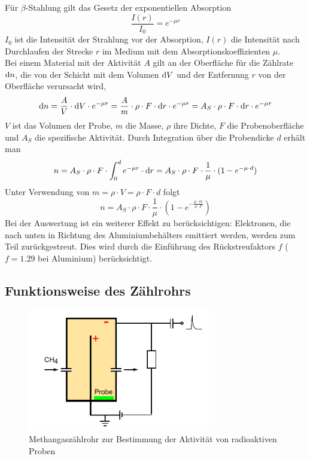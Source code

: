 Für $\beta$-Stahlung gilt das Gesetz der exponentiellen Absorption
\begin{equation}
  \frac{I(r)}{I_0} =e^{-\mu r}
\end{equation}
$I_0$ ist die Intensität der Strahlung vor der Absorption, $I(r)$ die Intensität nach
Durchlaufen der Strecke $r$ im Medium mit dem Absorptionskoeffizienten $\mu$.\\
Bei einem Material mit der Aktivität $A$ gilt an der Oberfläche für die Zählrate $\mathrm{d} n$,
die von der Schicht mit dem Volumen $\mathrm{d} V$ und
der Entfernung $r$ von der Oberfläche verursacht wird,
\begin{equation}
  \mathrm{d} n= \frac{A}{V} \cdot \mathrm{d} V \cdot e^{-\mu r}=
  \frac{A}{m} \cdot \rho \cdot F \cdot \mathrm{d} r \cdot e^{-\mu r}=
  A_S \cdot \rho \cdot F \cdot \mathrm{d} r \cdot e^{-\mu r}
\end{equation}
$V$ ist das Volumen der Probe, $m$ die Masse, $\rho$ ihre Dichte, $F$ die Probenoberfläche und $A_S$
die spezifische Aktivität. Durch Integration über die Probendicke $d$ erhält man
\begin{equation}
  n= A_S \cdot \rho \cdot F \cdot \int_{0}^{d}e^{-\mu r} \cdot \mathrm{d} r=
  A_S \cdot \rho \cdot F \cdot \frac{1}{\mu} \cdot (1-e^{-\mu \cdot d})
\end{equation}
Unter Verwendung von $m=\rho \cdot V= \rho \cdot F \cdot d$ folgt
\begin{equation}
\label{eq:kalium:countrate}
  n= A_S \cdot \rho \cdot F \cdot \frac{1}{\mu} \cdot (1-e^{-\frac{\mu \cdot m}{\rho \cdot F}})
\end{equation}
Bei der Auswertung ist ein weiterer Effekt zu berücksichtigen:
Elektronen, die nach unten in Richtung des Aluminiumbehälters emittiert werden,
werden zum Teil zurückgestreut. Dies wird durch die Einführung des Rückstreufaktors $f$
($f = 1.29$ bei Aluminium) berücksichtigt.

\subsection{Funktionsweise des Zählrohrs}

\begin{figure}[H]
\begin{center}
  \includegraphics[width=8cm]{../img/aufbau}
  \caption{Methangaszählrohr zur Bestimmung der Aktivität von radioaktiven Proben}
  \label{img:aufbau}
\end{center}
\end{figure}

